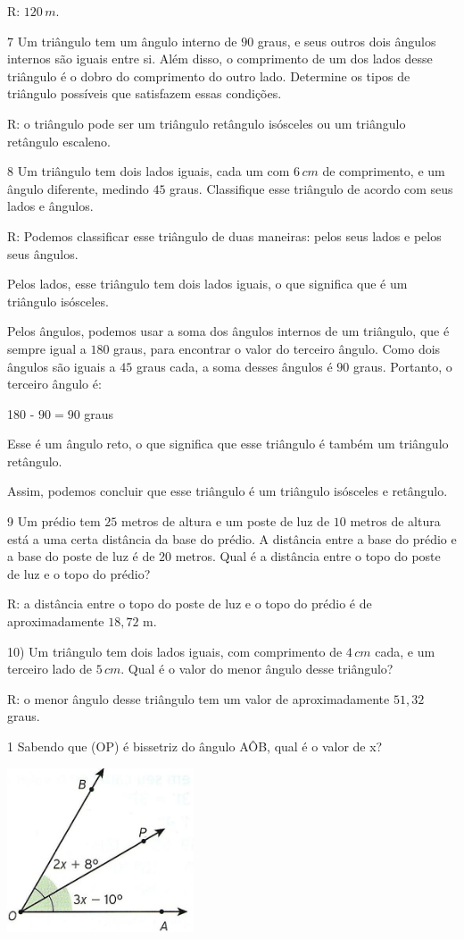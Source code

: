 R: $120\,m$.

\num{7}  Um triângulo tem um ângulo interno de $90$ graus, e seus outros dois
ângulos internos são iguais entre si. Além disso, o comprimento de um
dos lados desse triângulo é o dobro do comprimento do outro lado.
Determine os tipos de triângulo possíveis que satisfazem essas
condições.

R: o triângulo pode ser um triângulo retângulo isósceles ou um triângulo
retângulo escaleno.

\num{8}  Um triângulo tem dois lados iguais, cada um com $6\,cm$ de comprimento,
e um ângulo diferente, medindo $45$ graus. Classifique esse triângulo de
acordo com seus lados e ângulos.

R: Podemos classificar esse triângulo de duas maneiras: pelos seus lados
e pelos seus ângulos.

Pelos lados, esse triângulo tem dois lados iguais, o que significa que é
um triângulo isósceles.

Pelos ângulos, podemos usar a soma dos ângulos internos de um triângulo,
que é sempre igual a $180$ graus, para encontrar o valor do terceiro
ângulo. Como dois ângulos são iguais a $45$ graus cada, a soma desses
ângulos é $90$ graus. Portanto, o terceiro ângulo é:

180 - $90 = 90$ graus

Esse é um ângulo reto, o que significa que esse triângulo é também um
triângulo retângulo.

Assim, podemos concluir que esse triângulo é um triângulo isósceles e
retângulo.

\num{9}  Um prédio tem $25$ metros de altura e um poste de luz de $10$ metros de
altura está a uma certa distância da base do prédio. A distância entre a
base do prédio e a base do poste de luz é de $20$ metros. Qual é a
distância entre o topo do poste de luz e o topo do prédio?

R: a distância entre o topo do poste de luz e o topo do prédio é de
aproximadamente $18,72$ m.

10) Um triângulo tem dois lados iguais, com comprimento de $4\,cm$ cada, e
um terceiro lado de $5\,cm$. Qual é o valor do menor ângulo desse
triângulo?

R: o menor ângulo desse triângulo tem um valor de aproximadamente $51,32$
graus.



\num{1}  Sabendo que (OP) é bissetriz do ângulo AÔB, qual é o valor de x?

\includegraphics[width=2.17708in,height=1.91619in]{./imgSAEB_6_MAT/media/image62.jpeg}

